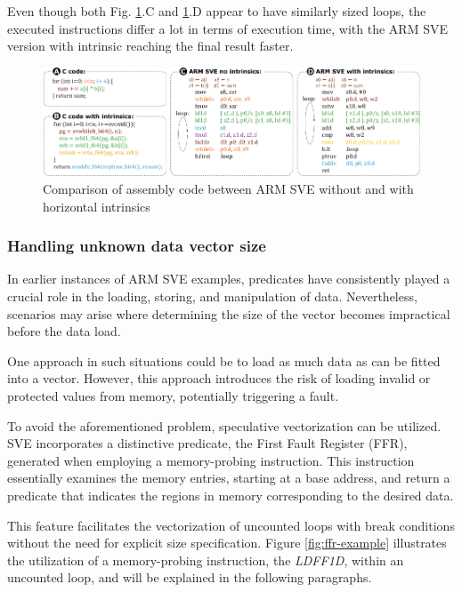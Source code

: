 Even though both Fig. \ref{fig:horizontal-reductions}.C and \ref{fig:horizontal-reductions}.D appear to have similarly sized loops, the executed instructions differ a lot in terms of execution time, with the ARM SVE version with intrinsic reaching the final result faster.

\begin{figure}[H]
	\begin{center}
 		\includegraphics[width=\linewidth]{images/horizontal-reductions.pdf}
 		\caption{Comparison of assembly code between ARM SVE without and with horizontal intrinsics}
 		\label{fig:horizontal-reductions}
	\end{center} 
\end{figure}

\subsubsection{Handling unknown data vector size}


In earlier instances of ARM SVE examples, predicates have consistently played a crucial role in the loading, storing, and manipulation of data. Nevertheless, scenarios may arise where determining the size of the vector becomes impractical before the data load. 

One approach in such situations could be to load as much data as can be fitted into a vector. However, this approach introduces the risk of loading invalid or protected values from memory, potentially triggering a fault.

To avoid the aforementioned problem, speculative vectorization can be utilized. SVE incorporates a distinctive predicate, the First Fault Register (FFR), generated when employing a memory-probing instruction. This instruction essentially examines the memory entries, starting at a base address, and return a predicate that indicates the regions in memory corresponding to the desired data.


This feature facilitates the vectorization of uncounted loops with break conditions without the need for explicit size specification. Figure \ref{fig:ffr-example} illustrates the utilization of a memory-probing instruction, the \textit{LDFF1D}, within an uncounted loop, and will be explained in the following paragraphs.


